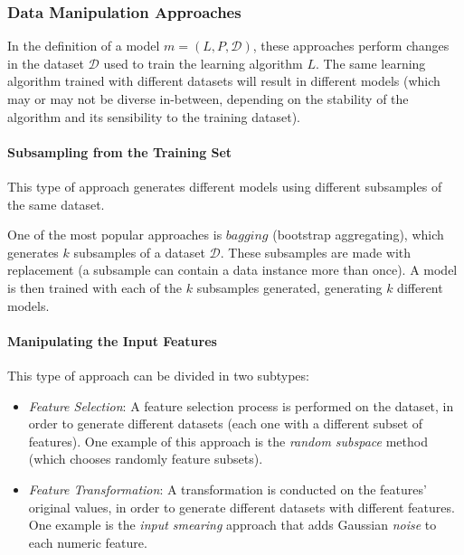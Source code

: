 \subsubsection{Data Manipulation Approaches}

In the definition of a model $m = (L, P, \mathcal{D})$, these approaches perform changes in the dataset $\mathcal{D}$ used to train the learning algorithm $L$. The same learning algorithm trained with different datasets will result in different models (which may or may not be diverse in-between, depending on the stability of the algorithm and its sensibility to the training dataset).

\paragraph{Subsampling from the Training Set}\mbox{}

This type of approach generates different models using different subsamples of the same dataset.

One of the most popular approaches is $bagging$ (bootstrap aggregating), which generates $k$ subsamples of a dataset $\mathcal{D}$.
These subsamples are made with replacement (a subsample can contain a data instance more than once).
A model is then trained with each of the $k$ subsamples generated, generating $k$ different models.

\paragraph{Manipulating the Input Features}\mbox{}

This type of approach can be divided in two subtypes:

\begin{itemize}
	\item \textit{Feature Selection}: 
		A feature selection process is performed on the dataset, in order to generate different datasets (each one with a different subset of features).
		One example of this approach is the \textit{random subspace} method \cite{ho1998random} (which chooses randomly feature subsets).
		
	\item \textit{Feature Transformation}:
		A transformation is conducted on the features' original values, in order to generate different datasets with different features.
		One example is the \textit{input smearing} approach \cite{Frank2006} that adds Gaussian \textit{noise} to each numeric feature.
\end{itemize}

